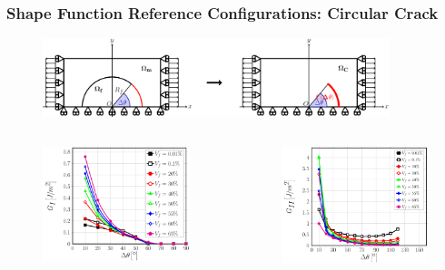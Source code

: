 \documentclass[first,firstsupp,lastsupp,last,hyperref,table]{ETHclass}
\begin{document}
\begin{frame}
\frametitle{\vspace{0.4cm}\footnotesize Shape Function Reference Configurations: Circular Crack}
\vspace{-1.25cm}
\centering
\begin{figure}
\includegraphics[width=0.9\textwidth]{RUCcurvedcrack.pdf}
\end{figure}
\vspace{-0.5cm}
\begin{columns}[c]
\begin{column}{0.5\textwidth}
\centering
\begin{figure}
\centering
\includegraphics[width=0.9\columnwidth]{GI-free-curvedcrack.pdf}
\end{figure}
\end{column}
\begin{column}{0.5\textwidth}
\centering
\begin{figure}
\centering
\includegraphics[width=0.9\columnwidth]{GII-free-curvedcrack.pdf}

\end{figure}
\end{column}
\end{columns}
\end{frame}
\end{document}

